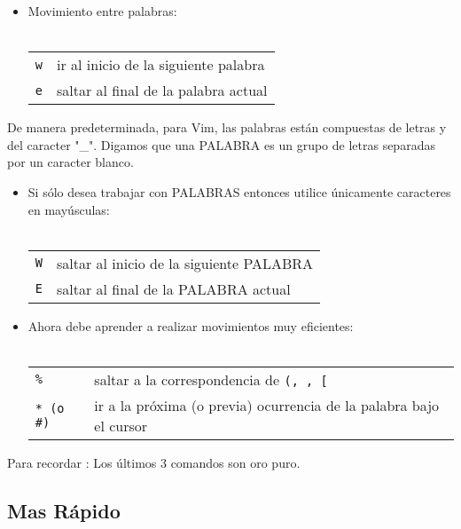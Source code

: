 \begin{itemize}
	\item Movimiento entre palabras: \\ \\
\begin{tabular}{ l l }
	\texttt{w} & ir al inicio de la siguiente palabra \\
	\texttt{e} & saltar al final de la palabra actual \\
\end{tabular}
\end{itemize}



	De manera predeterminada, para Vim, las palabras están compuestas de letras y del caracter "\_". 
Digamos que una PALABRA es un grupo de letras separadas por un caracter blanco. 

\begin{itemize}
	\item Si sólo desea trabajar con PALABRAS entonces utilice únicamente caracteres en mayúsculas: \\ \\
\begin{tabular}{ l l }
	\texttt{W} & saltar al inicio de la siguiente PALABRA \\
	\texttt{E} & saltar al final de la PALABRA actual \\
\end{tabular}
\end{itemize}





	
\begin{itemize}
	\item Ahora debe aprender a realizar movimientos muy eficientes: \\ \\
\begin{tabular}{ l l }
	\texttt{\%} & saltar a la correspondencia de \texttt{(, {, [ } }  \\
        \texttt{* (o \#)} & ir a la próxima (o previa) ocurrencia de la palabra bajo el cursor \\
\end{tabular}
\end{itemize}


Para recordar : Los últimos 3 comandos son oro puro.

\subsection{Mas Rápido}

